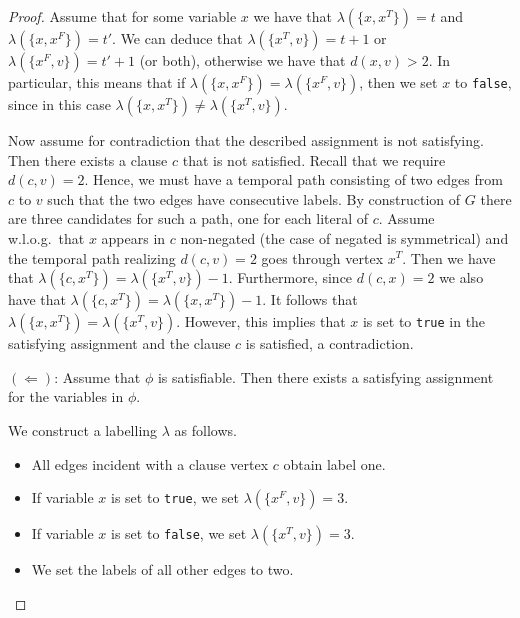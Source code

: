 \documentclass[11pt,a4paper]{article}
\theoremstyle{remark}
\theoremstyle{definition}
\begin{document}
\begin{proof}
Assume that for some variable $x$ we have that $\lambda(\{x,x^T\})=t$ and $\lambda(\{x,x^F\})=t'$. We can deduce that $\lambda(\{x^T,v\})=t+1$ or $\lambda(\{x^F,v\})=t'+1$ (or both), otherwise we have that $d(x,v)>2$.
In particular, this means that if $\lambda(\{x,x^F\})=\lambda(\{x^F,v\})$, then we set $x$ to \texttt{false}, since in this case $\lambda(\{x,x^T\})\neq\lambda(\{x^T,v\})$.


Now assume for contradiction that the described assignment is not satisfying. Then there exists a clause $c$ that is not satisfied. Recall that we require $d(c,v)=2$. Hence, we must have a temporal path consisting of two edges from $c$ to $v$ such that the two edges have consecutive labels. By construction of $G$ there are three candidates for such a path, one for each literal of $c$. Assume w.l.o.g.\ that $x$ appears in $c$ non-negated (the case of negated is symmetrical) and the temporal path realizing $d(c,v)=2$ goes through vertex $x^T$. Then we have that $\lambda(\{c,x^T\})=\lambda(\{x^T,v\})-1$. Furthermore, since $d(c,x)=2$ we also have that $\lambda(\{c,x^T\})=\lambda(\{x,x^T\})-1$. It follows that $\lambda(\{x,x^T\})=\lambda(\{x^T,v\})$. However, this implies that $x$ is set to \texttt{true} in the satisfying assignment and the clause $c$ is satisfied, a contradiction.


$(\Leftarrow)$: Assume that $\phi$ is satisfiable. Then there exists a satisfying assignment for the variables in $\phi$.

We construct a labelling $\lambda$ as follows.
\begin{itemize}
    \item All edges incident with a clause vertex $c$ obtain label one.
    \item If variable $x$ is set to \texttt{true}, we set $\lambda(\{x^F,v\})=3$.
    \item If variable $x$ is set to \texttt{false}, we set $\lambda(\{x^T,v\})=3$.
    \item We set the labels of all other edges to two.
\end{itemize}


\end{proof}
\end{document}

